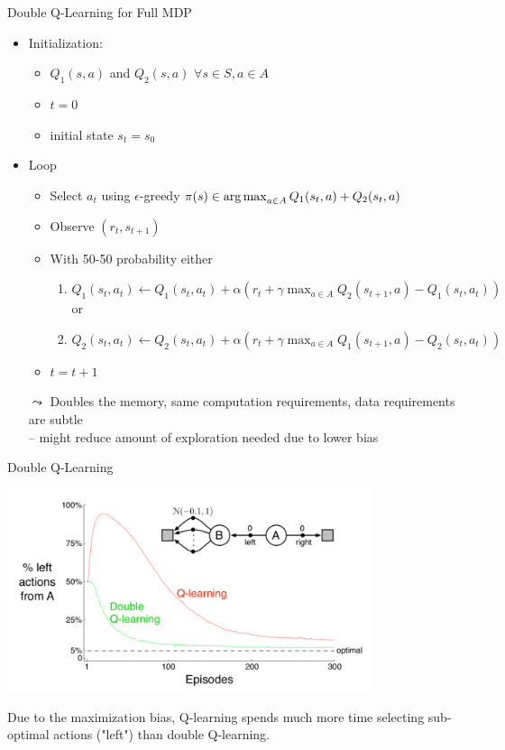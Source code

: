\documentclass[aspectratio=169]{../latex_main/tntbeamer}  %
\begin{document}
\begin{frame}[c]{Double Q-Learning for Full MDP}	
	
	\begin{itemize}
		\item Initialization:
		\begin{itemize}
			\item $Q_1(s,a)$ and $Q_2(s,a)$ $\forall s \in S, a\in A$
			\item $t= 0$
			\item initial state $s_t = s_0$
		\end{itemize}
		\item Loop
		\begin{itemize}
			\item Select $a_t$ using $\epsilon$-greedy $\pi(s) \in \operatorname*{arg\,max}_{a \in A} Q_1(s_t, a) + Q_2(s_t , a)$
			\item Observe $(r_t, s_{t+1})$
			\item With 50-50 probability either
			\begin{enumerate}
				\item $Q_1(s_t, a_t) \gets Q_1(s_t, a_t) + \alpha (r_t +\gamma \max_{a\in A} Q_2(s_{t+1}, a) - Q_1(s_t, a_t))$\\
				or
				\item $Q_2(s_t, a_t) \gets Q_2(s_t, a_t) + \alpha (r_t +\gamma \max_{a\in A} Q_1(s_{t+1}, a) - Q_2(s_t, a_t))$
			\end{enumerate}
			\item $t = t + 1 $
		\end{itemize}
		\bigskip
		\pause
		\item[$\leadsto$] Doubles the memory, same computation requirements, data requirements are subtle\\ -- might reduce amount of exploration needed due to lower bias
	\end{itemize}
	
	
\end{frame}
\begin{frame}[c]{Double Q-Learning~}
	
\begin{center}
\includegraphics[width=0.8\textwidth]{images/double_q.png}
\end{center}

Due to the maximization bias, Q-learning spends much more time
selecting sub-optimal actions ("left") than double Q-learning.
	
	
\end{frame}
\end{document}
